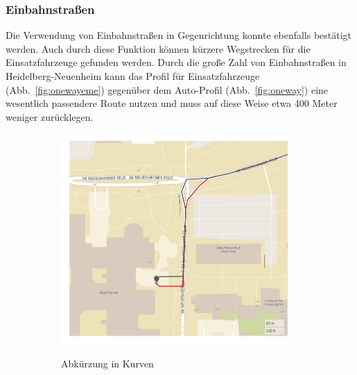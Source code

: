 \subsubsection{Einbahnstraßen}

Die Verwendung von Einbahnstraßen in Gegenrichtung konnte ebenfalls bestätigt werden.
Auch durch diese Funktion können kürzere Wegstrecken für die Einsatzfahrzeuge gefunden werden. 
Durch die große Zahl von Einbahnstraßen in Heidelberg-Neuenheim kann das Profil für Einsatzfahrzeuge (Abb.~\ref{fig:onewayeme}) gegenüber dem Auto-Profil (Abb.~\ref{fig:oneway}) eine wesentlich passendere Route nutzen und muss auf diese Weise etwa 400 Meter weniger zurücklegen.

\begin{figure}[H]
\centering
\begin{subfigure}{0.49\textwidth}
\centering
\includegraphics[width = 0.95\textwidth]{../media/oppositecurve.png} \\
\caption{Abkürzung in Kurven}
\label{fig:oppositecurve}
\end{subfigure}
\begin{subfigure}{0.49\textwidth}
\centering

\end{subfigure}
\end{figure}

